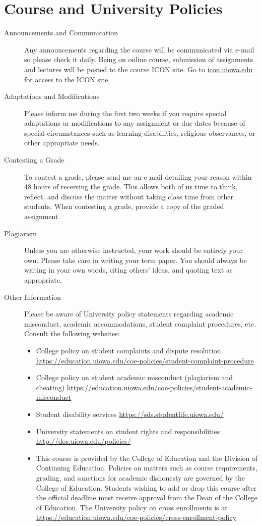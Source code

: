 \documentclass[11pt,article,oneside]{memoir}
\begin{document}
\section*{Course and University Policies}
\begin{description}
\item[Announcements and Communication] %
Any announcements regarding the course will be communicated via e-mail so please check it daily. Being on online course, submission of assignments and lectures will be posted to the course ICON site. Go to \href{http://icon.uiowa.edu}{icon.uiowa.edu} for access to the ICON site.
\item[Adaptations and Modifications] Please inform me during the first two weeks if you require special adaptations or modifications to any assignment or due dates because of special circumstances such as learning disabilities, religious observances, or other appropriate needs.
\item[Contesting a Grade] To contest a grade, please send me an e-mail detailing your reason within 48 hours of receiving the grade. This allows both of us time to think, reflect, and discuss the matter without taking class time from other students. When contesting a grade, provide a copy of the graded assignment.
\item[Plagiarism] Unless you are otherwise instructed, your work should be entirely your own. Please take care in writing your term paper.  You should always be writing in your own words, citing others' ideas, and quoting text as appropriate.
\item[Other Information] Please be aware of University policy statements regarding academic misconduct, academic accommodations, student complaint procedures, etc.  Consult the following websites:
  \begin{itemize}
    \item College policy on student complaints and dispute resolution \url{https://education.uiowa.edu/coe-policies/student-complaint-procedure}
    \item College policy on student academic misconduct (plagiarism and cheating) \url{https://education.uiowa.edu/coe-policies/student-academic-misconduct}
    \item Student disability services \url{https://sds.studentlife.uiowa.edu/}
    \item University statements on student rights and responsibilities \url{http://dos.uiowa.edu/policies/}
    \item This course is provided by the College of Education and the Division of Continuing Education.  Policies on matters such as course requirements, grading, and sanctions for academic dishonesty are governed by the College of Education. Students wishing to add or drop this course after the official deadline must receive approval from the Dean of the College of Education. The University policy on cross enrollments is at \url{https://education.uiowa.edu/coe-policies/cross-enrollment-policy}
  \end{itemize}
\end{description}
\end{document}
